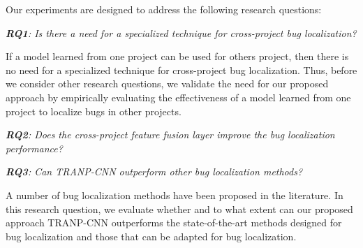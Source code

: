 
Our experiments are designed to address the following research questions:

\vspace{0.2cm}\noindent\textit{\textbf{RQ1}: Is there a need for a specialized technique for cross-project bug localization?}

If a model learned from one project can be used for others project, then there is no need for a specialized technique for cross-project bug localization. Thus, before we consider other research questions, we validate the need for our proposed approach by empirically evaluating the effectiveness of a model learned from one project to localize bugs in other projects.

\vspace{0.2cm}\noindent\textit{\textbf{RQ2}: Does the cross-project feature fusion layer improve the bug localization performance?}


\vspace{0.2cm}\noindent\textit{\textbf{RQ3}: Can TRANP-CNN outperform other bug localization methods?}

A number of bug localization methods have been proposed in the literature. In this research question, we evaluate whether and to what extent can our proposed approach TRANP-CNN outperforms the state-of-the-art methods designed for bug localization and those that can be adapted for bug localization. 